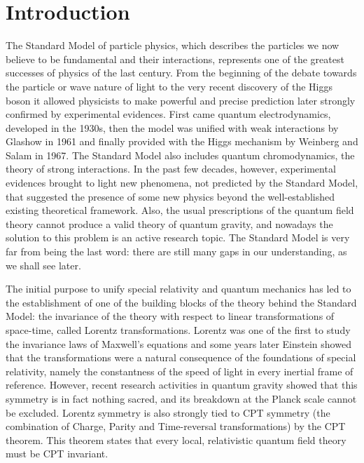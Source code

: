 \chapter{Introduction}
	The Standard Model of particle physics, which describes the particles we now believe to be fundamental and their interactions, represents one of the greatest successes of physics of the last century. From the beginning of the debate towards the particle or wave nature of light to the very recent discovery of the Higgs boson it allowed physicists to make powerful and precise prediction later strongly confirmed by experimental evidences. First came quantum electrodynamics, developed in the 1930s, then the model was unified with weak interactions by Glashow in 1961 and finally provided with the Higgs mechanism by Weinberg and Salam in 1967. The Standard Model also includes quantum chromodynamics, the theory of strong interactions. In the past few decades, however, experimental evidences brought to light new phenomena, not predicted by the Standard Model, that suggested the presence of some new physics beyond the well-established existing theoretical framework. Also, the usual prescriptions of the quantum field theory cannot produce a valid theory of quantum gravity, and nowadays the solution to this problem is an active research topic. The Standard Model is very far from being the last word: there are still many gaps in our understanding, as we shall see later.

	The initial purpose to unify special relativity and quantum mechanics has led to the establishment of one of the building blocks of the theory behind the Standard Model: the invariance of the theory with respect to linear transformations of space-time, called Lorentz transformations. Lorentz was one of the first to study the invariance laws of Maxwell's equations and some years later Einstein showed that the transformations were a natural consequence of the foundations of special relativity, namely the constantness of the speed of light in every inertial frame of reference. However, recent research activities in quantum gravity showed that this symmetry is in fact nothing sacred, and its breakdown at the Planck scale cannot be excluded. Lorentz symmetry is also strongly tied to CPT symmetry (the combination of Charge, Parity and Time-reversal transformations) by the CPT theorem. This theorem states that every local, relativistic quantum field theory must be CPT invariant.

